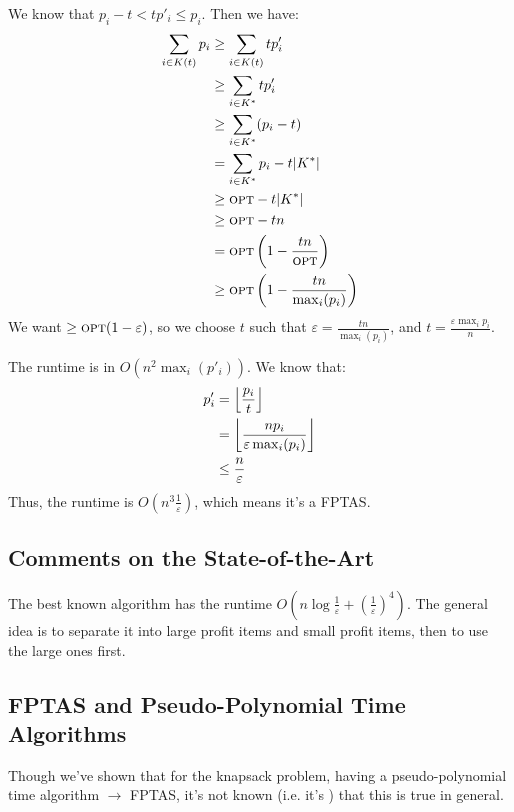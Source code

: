                 We know that $p_i - t < tp'_i \le p_i$.
                Then we have:
                \begin{align*}
                    \sum_{i \in K(t)} p_i &\ge \sum_{i \in K(t)} tp'_i \\
                    &\ge \sum_{i \in K^*} tp'_i \\
                    &\ge \sum_{i \in K^*}(p_i - t) \\
                    &= \sum_{i \in K^*}p_i - t|K^*| \\
                    &\ge \textsc{opt} - t|K^*| \\
                    &\ge \textsc{opt} - tn \\
                    &= \textsc{opt} \left(1 - \frac{tn}{\textsc{opt}}\right) \\
                    &\ge \textsc{opt} \left( 1 - \frac{tn}{\max_i (p_i)} \right)
                \end{align*}
                We want $\ge \textsc{opt}(1 - \varepsilon)$, so we choose $t$ such that $\varepsilon = \frac{tn}{\max_i (p_i)}$, and $t = \frac{\varepsilon \max_i p_i}{n}$.

                The runtime is in $O(n^2 \max_i (p'_i))$.
                We know that:
                \begin{align*}
                    p'_i &= \left \lfloor \frac{p_i}{t} \right \rfloor \\
                    &= \left \lfloor  \frac{n p_i}{\varepsilon \max_i (p_i)} \right \rfloor \\
                    &\le \frac{n}{\varepsilon}
                \end{align*}
                Thus, the runtime is $O(n^3 \frac{1}{\varepsilon})$, which means it's a FPTAS.

                \subsection{Comments on the State-of-the-Art} %
                \label{sub:comments_on_the_state_of_the_art}
                    The best known algorithm has the runtime $O(n \log \frac{1}{\varepsilon} + \left( \frac{1}{\varepsilon} \right)^4)$.
                    The general idea is to separate it into large profit items and small profit items, then to use the large ones first.
                \subsection{FPTAS and Pseudo-Polynomial Time Algorithms} %
                \label{sub:fptas_and_pseudo_polynomial_time_algorithms}
                    Though we've shown that for the knapsack problem, having a pseudo-polynomial time algorithm $\to$ FPTAS, it's not known (i.e. it's \open) that this is true in general.

